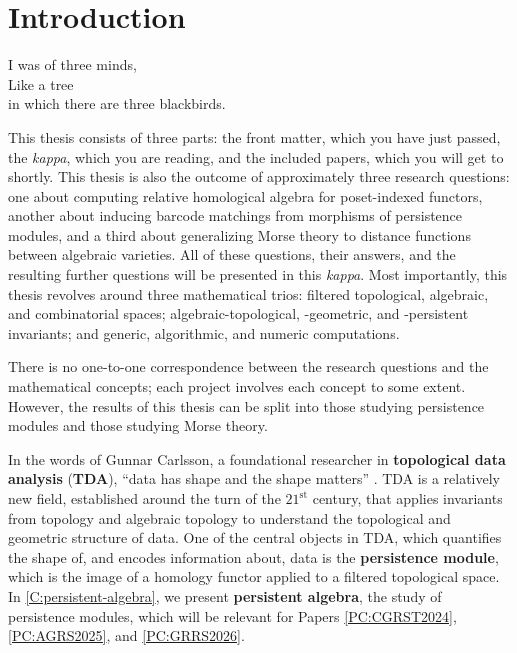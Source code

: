 
\chapter{Introduction}
\label{C:introduction}

\begin{epigraph}
  I was of three minds, \\
  Like a tree \\
  in which there are three blackbirds.\footnotemark
\end{epigraph}

This thesis consists of three parts: the front matter, which you have just passed, the \textit{kappa}, which you are reading, and the included papers, which you will get to shortly. This thesis is also the outcome of approximately three research questions: one about computing relative homological algebra for poset-indexed functors, another about inducing barcode matchings from morphisms of persistence modules, and a third about generalizing Morse theory to distance functions between algebraic varieties. All of these questions, their answers, and the resulting further questions will be presented in this \textit{kappa}. Most importantly, this thesis revolves around three mathematical trios: filtered topological, algebraic, and combinatorial spaces; algebraic-topological, -geometric, and -\nobreak persistent invariants; and generic, algorithmic, and numeric computations.

There is no one-to-one correspondence between the research questions and the mathematical concepts; each project involves each concept to some extent. However, the results of this thesis can be split into those studying persistence modules and those studying Morse theory.

In the words of Gunnar Carlsson, a foundational researcher in \textbf{topological data analysis} (\textbf{TDA}), ``data has shape and the shape matters'' \cite{Carlsson2015}. TDA is a relatively new field, established around the turn of the $\text{21}^{\text{st}}$ century, that applies invariants from topology and algebraic topology to understand the topological and geometric structure of data. One of the central objects in TDA, which quantifies the shape of, and encodes information about, data is the \textbf{persistence module}, which is the image of a homology functor applied to a filtered topological space. In \cref{C:persistent-algebra}, we present \textbf{persistent algebra}, the study of persistence modules, which will be relevant for Papers \ref{PC:CGRST2024}, \ref{PC:AGRS2025}, and \ref{PC:GRRS2026}.


